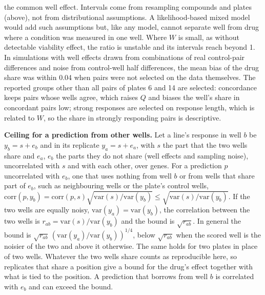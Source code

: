 \documentclass[pdflatex,sn-nature]{sn-jnl}
\begin{document}
the common well effect. Intervals come from resampling compounds and plates (above), not from distributional assumptions. A likelihood-based mixed model would add such assumptions but, like any model, cannot separate well from drug where a condition was measured in one well. Where $W$ is small, as without detectable viability effect, the ratio is unstable and its intervals reach beyond 1. In simulations with well effects drawn from combinations of real control-pair differences and noise from control-well half differences, the mean bias of the drug share was within 0.04 when pairs were not selected on the data themselves. The reported groups other than all pairs of plates 6 and 14 are selected: concordance keeps pairs whose wells agree, which raises $Q$ and biases the well's share in concordant pairs low; strong responses are selected on response length, which is related to $W$, so the share in strongly responding pairs is descriptive.

\textbf{Ceiling for a prediction from other wells.} Let a line's response in well $b$ be $y_b=s+e_b$ and in its replicate $y_a=s+e_a$, with $s$ the part that the two wells share and $e_a$, $e_b$ the parts they do not share (well effects and sampling noise), uncorrelated with $s$ and with each other, over genes. For a prediction $p$ uncorrelated with $e_b$, one that uses nothing from well $b$ or from wells that share part of $e_b$, such as neighbouring wells or the plate's control wells, $\mathrm{corr}(p,y_b)=\mathrm{corr}(p,s)\sqrt{\mathrm{var}(s)/\mathrm{var}(y_b)}\le\sqrt{\mathrm{var}(s)/\mathrm{var}(y_b)}$. If the two wells are equally noisy, $\mathrm{var}(y_a)=\mathrm{var}(y_b)$, the correlation between the two wells is $r_{ab}=\mathrm{var}(s)/\mathrm{var}(y_b)$ and the bound is $\sqrt{r_{ab}}$. In general the bound is $\sqrt{r_{ab}}\,(\mathrm{var}(y_a)/\mathrm{var}(y_b))^{1/4}$, below $\sqrt{r_{ab}}$ when the scored well is the noisier of the two and above it otherwise. The same holds for two plates in place of two wells. Whatever the two wells share counts as reproducible here, so replicates that share a position give a bound for the drug's effect together with what is tied to the position. A prediction that borrows from well $b$ is correlated with $e_b$ and can exceed the bound.
\end{document}
